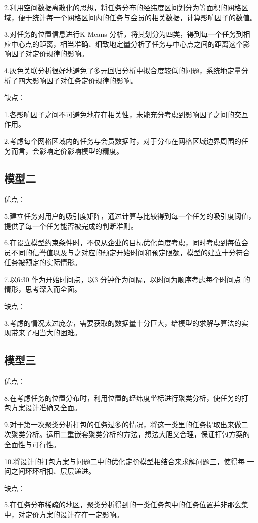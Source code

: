 \documentclass[withoutpreface,bwprint]{cumcmthesis} %
\begin{document}
2.利用空间数据离散化的思想，将任务分布的经纬度区间划分为等面积的网格区
域，便于统计每一个网格区间内的任务与会员的相关数据，计算影响因子的数值。

3.对任务的位置信息进行K-Means 分析，将其划分为四类，得到每一个任务到相
应中心点的距离，相当准确、细致地定量分析了任务与中心点之间的距离这个影
响因子对定价规律的影响。

4.灰色关联分析很好地避免了多元回归分析中拟合度较低的问题，系统地定量分
析了四大影响因子对任务定价规律的影响。

缺点：

1.各影响因子之间不可避免地存在相关性，未能充分考虑到影响因子之间的交互
作用。

2.考虑每个网格区域内的任务与会员数据时，对于分布在网格区域边界周围的任
务而言，会影响定价影响模型的精度。

\subsection{模型二}

优点：

5.建立任务对用户的吸引度矩阵，通过计算与比较得到每一个任务的吸引度阈值，
提供了每一个任务能否被完成的判断准则。

6.在设立模型约束条件时，不仅从企业的目标优化角度考虑，同时考虑到每位会
员不同的信誉值以及与之对应的预定开始时间和预定限额，模型的建立十分符合
任务被预定的实际情形。

7.以6:30 作为开始时间点，以3 分钟作为间隔，以时间为顺序考虑每个时间点
的情形，思考深入而全面。

缺点：

3.考虑的情况太过庞杂，需要获取的数据量十分巨大，给模型的求解与算法的实
现带来了相当大的困难。

\subsection{模型三}

优点：

8.在考虑任务的位置分布时，利用位置的经纬度坐标进行聚类分析，使任务的打
包方案设计准确又全面。

9.对于第一次聚类分析打包的任务过多的情况，将这一类里的任务提取出来做二
次聚类分析。运用二重嵌套聚类分析的方法，想法大胆又合理，保证打包方案的
全面性与可行性。

10.将设计的打包方案与问题二中的优化定价模型相结合来求解问题三，使得每
一问之间环环相扣、层层递进。

缺点：

5.在任务分布稀疏的地区，聚类分析得到的一类任务包中的任务位置并非那么集
中，对定价方案的设计存在一定影响。
\end{document}
